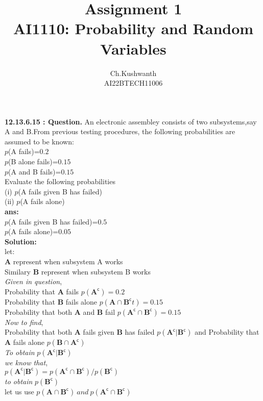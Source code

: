 \documentclass[journal,12pt,twocolumn]{IEEEtran}
\title{\textbf{Assignment 1}
\\ \textbf{AI1110:} Probability and Random Variables}
\author{Ch.Kushwanth
\\ AI22BTECH11006}
\begin{document}
\maketitle
\textbf{12.13.6.15 : Question.}
An electronic assembley consists of two subsystems,say A and B.From previous testing procedures, the following probabilities are assumed to be known:
\\ $p$(A fails)=$0.2$
\\ $p$(B alone fails)=$0.15$
\\ $p$(A and B fails)=$0.15$
\\ Evaluate the following probabilities
\\ (i) $p$(A fails given B has failed)
\\ (ii) $p$(A fails alone)
\\ \textbf{ans:}
\\ $p$(A fails given B has failed)=$ 0.5$ 
\\ $p$(A fails alone)=$0.05$
\\ \textbf{Solution:}
\\ let:
\\ \textbf{A} represent when subsystem A works
\\Similary \textbf{B} represent when subsystem B works
\\ \textit{Given in question},
\\Probability that \textbf{A} fails $p(\textbf{A}^\mathsf{c}) = 0.2$
\\Probability that \textbf{B} fails alone $p(\textbf{A} \cap \textbf{B} ^\mathsf{c}t)=0.15$
\\Probability that both \textbf{A} and \textbf{B} fail $ p(\textbf{A} ^\mathsf{c} \cap \textbf{B} ^\mathsf{c})=0.15$
\\ \textit{Now to find},
\\Probability that both \textbf{A} fails given \textbf{B} has failed $p(\textbf{A} ^\mathsf{c}|\textbf{B} ^\mathsf{c})$ and \mbox{Probability} that \textbf{A} fails alone $p(\textbf{B}\cap\textbf{A}^\mathsf{c})$
\linebreak 
\\ \textsl{To obtain }$p(\textbf{A} ^\mathsf{c}|\textbf{B} ^\mathsf{c})$
\\ \textit{we know that},
\\ $p(\textbf{A} ^\mathsf{c}|\textbf{B} ^\mathsf{c})=p( \textbf{A} ^\mathsf{c} \cap \textbf{B} ^\mathsf{c} ) / p(\textbf{B}^\mathsf{c})$
\\ \textsl{to obtain} $p(\textbf{B} ^\mathsf{c} ) $
\\let us use $p(\textbf{A} \cap \textbf{B} ^\mathsf{c}) \ and\  p(\textbf{A} ^\mathsf{c} \cap \textbf{B}^\mathsf{c})$
\end{document}
